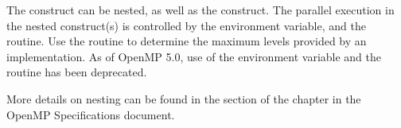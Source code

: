 The  construct can be nested, as well as the  construct.  
The parallel execution in the nested  construct(s) is controlled by the 
 environment variable, and the  routine. 
Use the  routine to determine the maximum levels provided by an implementation.
As of OpenMP 5.0, use of the  environment variable and the  routine 
has been deprecated.

More details on nesting can be found in the  section of the  
chapter in the OpenMP Specifications document.

















